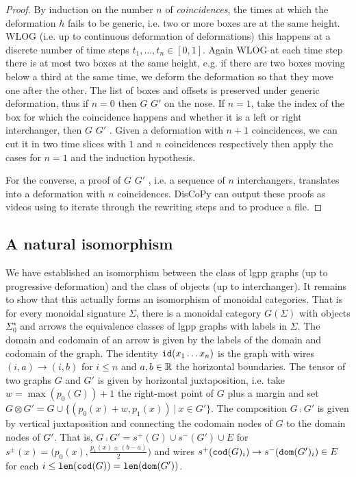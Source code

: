 \begin{proof}
By induction on the number $n$ of \emph{coincidences}, the times at which the deformation $h$ fails to be generic, i.e. two or more boxes are at the same height.
WLOG (i.e. up to continuous deformation of deformations) this happens at a discrete number of time steps $t_1, \dots, t_n \in [0, 1]$.
Again WLOG at each time step there is at most two boxes at the same height, e.g. if there are two boxes moving below a third at the same time, we deform the deformation so that they move one after the other.
The list of boxes and offsets is preserved under generic deformation, thus if $n = 0$ then  $G$  $G'$ \py{)} on the nose.
If $n = 1$, take  the index of the box for which the coincidence happens and  whether it is a left or right interchanger, then  $G$  $G'$ \py{)}.
Given a deformation with $n + 1$ coincidences, we can cut it in two time slices with $1$ and $n$ coincidences respectively then apply the cases for $n = 1$ and the induction hypothesis.

For the converse, a proof of  $G$  $G'$ \py{)}, i.e. a sequence of $n$ interchangers, translates into a deformation with $n$ coincidences.
DisCoPy can output these proofs as videos using  to iterate through the rewriting steps and  to produce a  file.
\end{proof}

\subsection{A natural isomorphism}

We have established an isomorphism between the class of lgpp graphs (up to progressive deformation) and the class of  objects (up to interchanger).
It remains to show that this actually forms an isomorphism of monoidal categories.
That is for every monoidal signature $\Sigma$, there is a monoidal category $G(\Sigma)$ with objects $\Sigma_0^\star$ and arrows the equivalence classes of lgpp graphs with labels in $\Sigma$.
The domain and codomain of an arrow is given by the labels of the domain and codomain of the graph.
The identity $\mathtt{id}(x_1 \dots x_n)$ is the graph with wires $(i, a) \to (i, b)$ for $i \leq n$ and $a, b \in \mathbb{R}$ the horizontal boundaries.
The tensor of two graphs $G$ and $G'$ is given by horizontal juxtaposition, i.e. take $w = \max(p_0(G)) + 1$ the right-most point of $G$ plus a margin and set $G \otimes G' = G \cup \{ (p_0(x) + w, p_1(x)) \ \vert \ x \in G' \}$.
The composition $G \fcmp G'$ is given by vertical juxtaposition and connecting the codomain nodes of $G$ to the domain nodes of $G'$.
That is, $G \fcmp G' = s^+(G) \cup s^-(G') \cup E$ for $s^\pm(x) = \big( p_0(x), \frac{p_1(x) \pm (b - a)}{2} \big)$ and wires $s^+(\mathtt{cod}(G)_i) \to s^-(\mathtt{dom}(G')_i) \in E$ for each $i \leq \mathtt{len}(\mathtt{cod}(G)) = \mathtt{len}(\mathtt{dom}(G'))$.

